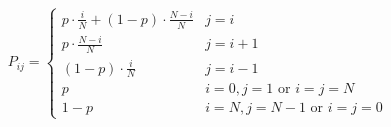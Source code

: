 \documentclass[12pt]{article}%
\begin{document}
\begin{equation*}
P_{ij} = \begin{cases}
           p \cdot \frac{i}{N} + (1-p) \cdot \frac{N-i}{N} & j = i \\
           p \cdot \frac{N-i}{N} & j = i +1 \\
           (1-p)\cdot \frac{i}{N} & j = i -1 \\
           p & i = 0, j=1 \text{ or } i = j = N \\
           1-p & i=N, j = N -1 \text{ or } i = j = 0
         \end{cases}
\end{equation*}
\end{document}
